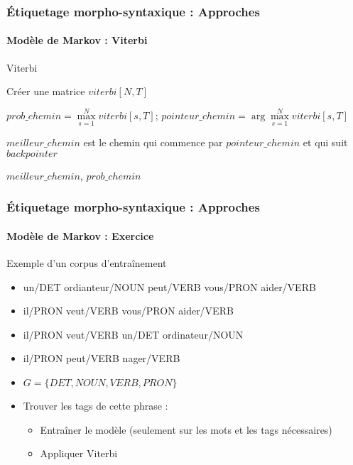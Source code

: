 \documentclass[xcolor=table]{beamer}
\begin{document}
\begin{frame}
\frametitle{Étiquetage morpho-syntaxique : Approches}
\framesubtitle{Modèle de Markov : Viterbi}
\vspace{-6pt}
\begin{block}{Viterbi }
	\scriptsize
	\begin{algorithm}[H]
		
		Créer une matrice $viterbi[N, T]$\;
		
		
	
		$prob\_chemin = \max\limits_{s=1}^N viterbi[s, T];\, pointeur\_chemin = \arg\max\limits_{s=1}^N viterbi[s, T]$\;
		
		$meilleur\_chemin$ est le chemin qui commence par $pointeur\_chemin$ et qui suit $backpointer$
		
		\Return $meilleur\_chemin$, $prob\_chemin$\;
		
	\end{algorithm}
\end{block}

\end{frame}


\begin{frame}
\frametitle{Étiquetage morpho-syntaxique : Approches}
\framesubtitle{Modèle de Markov : Exercice}

\begin{exampleblock}{Exemple d'un corpus d'entraînement}
	\begin{itemize}
		\item un/DET ordianteur/NOUN peut/VERB vous/PRON aider/VERB
		\item il/PRON veut/VERB vous/PRON aider/VERB
		\item il/PRON veut/VERB un/DET ordinateur/NOUN
		\item il/PRON peut/VERB nager/VERB
	\end{itemize}
\end{exampleblock}

\begin{itemize}
	\item $G = \{DET, NOUN, VERB, PRON\}$
	\item Trouver les tags de cette phrase : 
	\begin{itemize}
		\item Entraîner le modèle (seulement sur les mots et les tags nécessaires)
		\item Appliquer Viterbi
	\end{itemize}
\end{itemize}

\end{frame}
\end{document}
